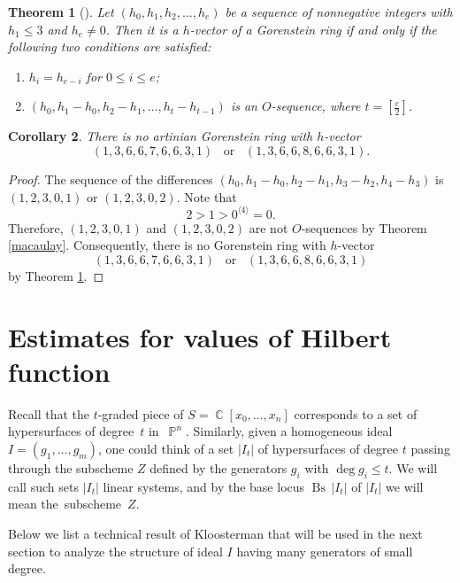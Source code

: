 \documentclass[a4paper,11pt,english,german]{amsart}
\DeclareMathOperator{\IP}{\mathbb{P}}
\DeclareMathOperator{\C}{\mathbb{C}}
\DeclareMathOperator{\Bs}{Bs}
\newtheorem{thm}{Theorem}[section]
\newtheorem{cor}[thm]{Corollary}
\theoremstyle{definition}
\begin{document}
\begin{thm}[{\cite[Theorem 4.2]{stanleyhilbert}}]\label{stanley}
	Let $(h_0,h_1,h_2,\dots,h_e)$ be a sequence of nonnegative integers with $h_1\leqslant 3$ and $h_e\neq 0$. Then it is a $h$-vector of a Gorenstein ring if and only if the following two conditions are satisfied:
	\begin{enumerate}
		\item[\emph{(1)}] $h_i=h_{e-i}$ \hspace{10pt} for $0\leqslant i \leqslant e$;
		\item[\emph{(2)}] $(h_0,h_1 -h_0, h_2-h_1,\dots, h_t -h_{t-1})$ is an $O$-sequence, where $t=[\frac{e}{2}]$.
	\end{enumerate}
\end{thm}
\begin{cor}\label{136676631}
	There is no artinian Gorenstein ring with $h$-vector 
	$$(1,3,6,6,7,6,6,3,1) \hspace{10pt}\text{or}\hspace{10pt}(1,3,6,6,8,6,6,3,1).$$
\end{cor}
\begin{proof}
	The sequence of the differences $(h_0,h_1-h_0,h_2-h_1,h_3-h_2,h_4-h_3)$ is $(1,2,3,0,1)$ or $(1,2,3,0,2)$. Note that $$2>1>0^{\langle 4 \rangle}=0.$$
	Therefore, $(1,2,3,0,1)$ and $(1,2,3,0,2)$ are not $O$-sequences by Theorem \ref{macaulay}. Consequently, there is no Gorenstein ring with $h$-vector $$(1,3,6,6,7,6,6,3,1)\hspace{10pt}\text{or}\hspace{10pt}(1,3,6,6,8,6,6,3,1)$$ by Theorem \ref{stanley}.
\end{proof}


\section{Estimates for values of Hilbert function}\label{4}


Recall that the $t$-graded piece of $S=\C[x_0,\dots ,x_n]$ corresponds to a set of hypersurfaces of degree~$t$ in~$\IP^n$. Similarly, given a homogeneous ideal $I=(g_1,\dots,g_m)$, one could think of a set $|I_t|$ of hypersurfaces of degree $t$ passing through the subscheme $Z$ defined by the generators $g_i$ with $\deg g_i\leqslant t$. We will call such sets $|I_t|$ linear systems, and by the base locus $\Bs\, |I_t|$ of $|I_t|$ we will mean the~subscheme~$Z$.

Below we list a technical result of Kloosterman that will be used in the next section to analyze the structure of ideal $I$ having many generators of small degree.
\end{document}
